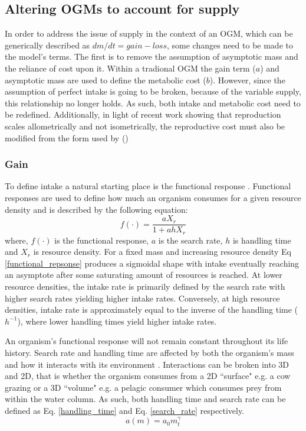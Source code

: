 \documentclass[a4paper, 11pt, hidelinks]{article} %
\begin{document}
	\subsection{Altering OGMs to account for supply}
	In order to address the issue of supply in the context of an OGM, which can be generically described as $dm/dt = gain - loss$, some changes need to be made to the model's terms.  The first is to remove the assumption of asymptotic mass and the reliance of cost upon it.  Within a tradional OGM the gain term ($ a $) and asymptotic mass are used to define the metabolic cost ($ b $).  However, since the assumption of perfect intake is going to be broken, because of the variable supply, this relationship no longer holds.  As such, both intake and metabolic cost need to be redefined.  Additionally, in light of recent work showing that reproduction scales allometrically and not isometrically, the reproductive cost must also be modified from the form used by \citeauthor{Charnov2001} (\citeyear{Charnov2001}) \parencite{Marshall2019, Barneche2018} %
	
	
	\subsubsection{Gain}
	To define intake a natural starting place is the functional response \parencite{Holling1959}.  Functional responses  are used to define how much an organism consumes for a given resource density and is described by the following equation:	
	\begin{equation}
		\label{functional_repsonse}
		f(\cdot) = \frac{a X_r}{1 + a h X_r}
	\end{equation}
	where, $ f(\cdot) $ is the functional response, $ a $ is the search rate, $ h $ is handling time and $ X_r $ is resource density.  
	For a fixed mass and increasing resource density Eq \ref{functional_repsonse} produces a sigmoidal shape with intake eventually reaching an asymptote after some saturating amount of resources is reached.  At lower resource densities, the intake rate is primarily defined by the search rate with higher search rates yielding higher intake rates.  Conversely, at high resource densities, intake rate is approximately equal to the inverse of the handling time ($ h^{-1} $), where lower handling times yield higher intake rates.  
	
	An organism's functional response will not remain constant throughout its life history.  Search rate and handling time are affected by both the organism's mass and how it interacts with its environment \parencite{Pawar2012}.  
	Interactions can be broken into 3D and 2D, that is whether the organism consumes from a 2D ``surface" e.g. a cow grazing or a 3D ``volume" e.g. a pelagic consumer which consumes prey from within the water column.  As such, both handling time and search rate can be defined as Eq. \ref{handling_time} and Eq. \ref{search_rate} respectively.
	\begin{equation}
		\label{search_rate}
		a(m) = a_0 m_t^\gamma
	\end{equation}
	
\end{document}
